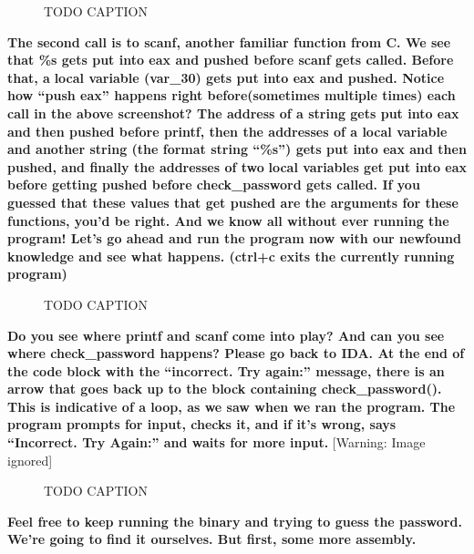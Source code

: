 \documentclass[letterpaper]{article}
\newcommand{\sitfig}[3]{
\begin{figure}[H]
\centering
\makebox[\textwidth][c]{
#2
}
\caption{#3}
\label{#1}
\end{figure}
}
\newcommand{\sitgfx}[4][scale=1.0]{
\sitfig{#3}{\texttt{[image: \#2]}}{#4}
}
\begin{document}
  
\sitgfx[width=6.5in,height=4.611in]{FINALWORKINGDOCFORMERLYPRECURSOR-img014.png}{fig:unk}{TODO CAPTION}
 \textbf{\newline
The second call is to scanf, another familiar function from C. We see that \%s gets put into eax and pushed before scanf
gets called. Before that, a }\textbf{\textcolor[rgb]{0.21960784,0.4627451,0.11372549}{local variable
}}\textbf{(var\_30) gets put into eax and pushed. Notice how ``push eax'' happens right before(sometimes multiple
times) each call in the above screenshot? The address of a string gets put into eax and then pushed before printf, then
the addresses of a local variable and another string (the format string ``\%s'') gets put into eax and then pushed, and
finally the addresses of two }\textbf{\textcolor[rgb]{0.21960784,0.4627451,0.11372549}{local variables }}\textbf{get
put into eax before getting pushed before check\_password gets called. If you guessed that these values that get pushed
are the arguments for these functions, you'd be right. And we know all without ever running the program! Let's go ahead
and run the program now with our newfound knowledge and see what happens. (ctrl+c exits the currently running
program)\newline
}  
\sitgfx[width=6.5in,height=1.139in]{FINALWORKINGDOCFORMERLYPRECURSOR-img015.png}{fig:unk}{TODO CAPTION}
 

\textbf{Do you see where printf and scanf come into play? And can you see where check\_password happens? Please go back
to IDA. At the end of the code block with the ``incorrect. Try again:'' message, there is an arrow that goes back up to
the block containing check\_password(). This is indicative of a loop, as we saw when we ran the program. The program
prompts for input, checks it, and if it's wrong, says ``Incorrect. Try Again:'' and waits for more input.  }  [Warning:
Image ignored] %
\sitgfx[width=6.5in,height=3.028in]{FINALWORKINGDOCFORMERLYPRECURSOR-img016.png}{fig:unk}{TODO CAPTION}
 \textbf{\newline
Feel free to keep running the binary and trying to guess the password. We're going to find it ourselves. But first, some
more assembly. \newline
}
\end{document}
